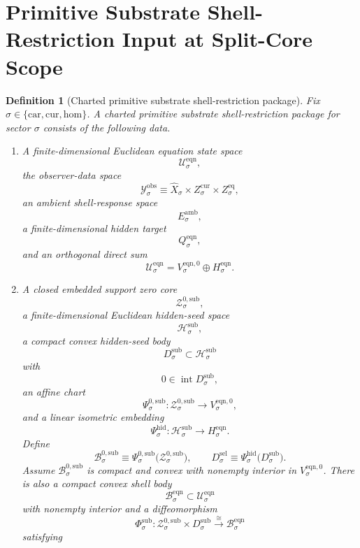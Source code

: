 \documentclass[11pt]{article}
\newcommand{\Car}{\mathrm{car}}
\newcommand{\Cur}{\mathrm{cur}}
\newcommand{\Hom}{\mathrm{hom}}
\newcommand{\VisibleAffine}[1]{\widehat X_{#1}}
\newcommand{\DataSpace}[1]{\mathcal Y_{#1}^{\mathrm{obs}}}
\newcommand{\AmbientTarget}[1]{E_{#1}^{\mathrm{amb}}}
\newcommand{\EqnSpace}[1]{\mathcal U_{#1}^{\mathrm{eqn}}}
\newcommand{\EqnBody}[1]{\mathcal B_{#1}^{\mathrm{eqn}}}
\newcommand{\EqnZero}[1]{V_{#1}^{\mathrm{eqn},0}}
\newcommand{\EqnHidden}[1]{H_{#1}^{\mathrm{eqn}}}
\newcommand{\EqnTarget}[1]{Q_{#1}^{\mathrm{eqn}}}
\newcommand{\SubZeroCore}[1]{\mathcal Z_{#1}^{0,\mathrm{sub}}}
\newcommand{\SeedHidden}[1]{\mathcal H_{#1}^{\mathrm{sub}}}
\newcommand{\SeedHiddenBody}[1]{D_{#1}^{\mathrm{sub}}}
\newcommand{\SubZeroChart}[1]{\Psi_{#1}^{0,\mathrm{sub}}}
\newcommand{\HiddenChart}[1]{\Psi_{#1}^{\mathrm{hid}}}
\newcommand{\SubSplit}[1]{\Phi_{#1}^{\mathrm{sub}}}
\newcommand{\ZeroBody}[1]{\mathcal B_{#1}^{0,\mathrm{sub}}}
\newcommand{\GapBody}[1]{D_{#1}^{\mathrm{sel}}}
\newtheorem{definition}{Definition}
\begin{document}
\section{Primitive Substrate Shell-Restriction Input at Split-Core Scope}

\begin{definition}[Charted primitive substrate shell-restriction package]
\label{def:input}
Fix \(\sigma\in\{\Car,\Cur,\Hom\}\). A \emph{charted primitive substrate shell-restriction package} for sector \(\sigma\) consists of the following data.
\begin{enumerate}
    \item A finite-dimensional Euclidean equation state space
    \[
    \EqnSpace{\sigma},
    \]
    the observer-data space
    \[
    \DataSpace{\sigma}
    \equiv
    \VisibleAffine{\sigma}\times Z_{\sigma}^{\mathrm{cur}}\times Z_{\sigma}^{\mathrm{eq}},
    \]
    an ambient shell-response space
    \[
    \AmbientTarget{\sigma},
    \]
    a finite-dimensional hidden target
    \[
    \EqnTarget{\sigma},
    \]
    and an orthogonal direct sum
    \[
    \EqnSpace{\sigma}
    =
    \EqnZero{\sigma}\oplus\EqnHidden{\sigma}.
    \]
    \item A closed embedded support zero core
    \[
    \SubZeroCore{\sigma},
    \]
    a finite-dimensional Euclidean hidden-seed space
    \[
    \SeedHidden{\sigma},
    \]
    a compact convex hidden-seed body
    \[
    \SeedHiddenBody{\sigma}\subset\SeedHidden{\sigma}
    \]
    with
    \[
    0\in\operatorname{int}\SeedHiddenBody{\sigma},
    \]
    an affine chart
    \[
    \SubZeroChart{\sigma}:\SubZeroCore{\sigma}\to\EqnZero{\sigma},
    \]
    and a linear isometric embedding
    \[
    \HiddenChart{\sigma}:\SeedHidden{\sigma}\to\EqnHidden{\sigma}.
    \]
    Define
    \[
    \ZeroBody{\sigma}
    \equiv
    \SubZeroChart{\sigma}\bigl(\SubZeroCore{\sigma}\bigr),
    \qquad
    \GapBody{\sigma}
    \equiv
    \HiddenChart{\sigma}\bigl(\SeedHiddenBody{\sigma}\bigr).
    \]
    Assume \(\ZeroBody{\sigma}\) is compact and convex with nonempty interior in \(\EqnZero{\sigma}\). There is also a compact convex shell body
    \[
    \EqnBody{\sigma}\subset\EqnSpace{\sigma}
    \]
    with nonempty interior and a diffeomorphism
    \begin{equation}
    \SubSplit{\sigma}:
    \SubZeroCore{\sigma}\times \SeedHiddenBody{\sigma}
    \xrightarrow{\cong}
    \EqnBody{\sigma}
    \label{eq:split}
    \end{equation}
    satisfying
    \begin{equation}

\end{equation}
\end{enumerate}
\end{definition}
\end{document}
